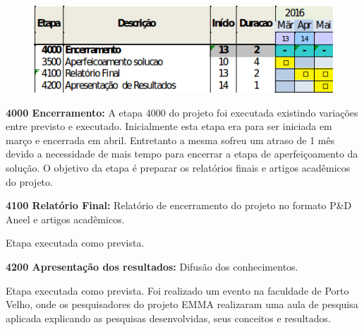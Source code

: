 \begin{figure}[H]
\centering
\includegraphics[width=0.7\columnwidth]{figs/etapa4}
\end{figure} 

\noindent
\textbf{4000 Encerramento:} A etapa 4000 do projeto foi executada existindo
variações entre previsto e executado. Inicialmente esta etapa era para ser
iniciada em março e encerrada em abril. Entretanto a mesma sofreu um atraso de 1
mês devido a necessidade de mais tempo para encerrar a etapa de aperfeiçoamento
da solução. O objetivo da etapa é preparar os relatórios finais e artigos acadêmicos do projeto.

\noindent
\textbf{4100 Relatório Final:} Relatório de encerramento do projeto no formato
P\&D Aneel e artigos acadêmicos.

Etapa executada como prevista. 

\noindent
\textbf{4200 Apresentação dos resultados:} Difusão dos conhecimentos.

Etapa executada como prevista. Foi realizado um evento na faculdade de Porto
Velho, onde os pesquisadores do projeto EMMA realizaram uma aula de pesquisa
aplicada explicando as pesquisas desenvolvidas, seus conceitos e resultados.
 